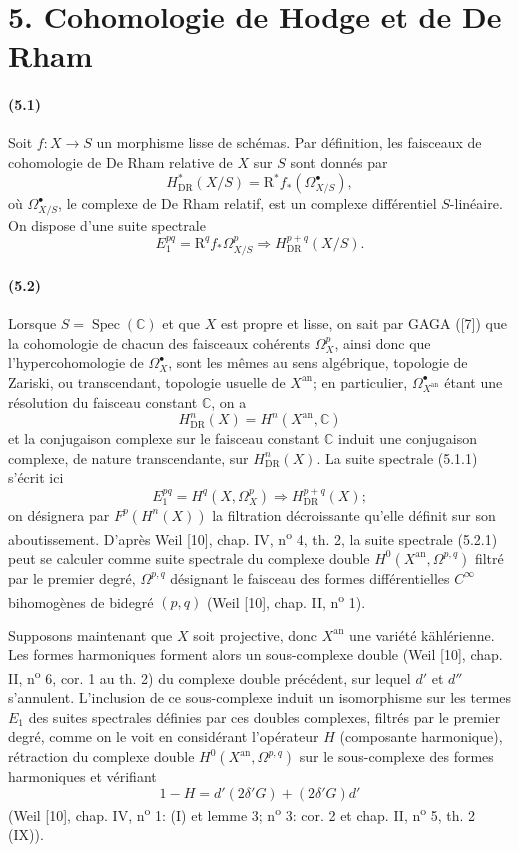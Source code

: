 \documentclass[10pt]{article}
\newcommand{\R}{\mathrm R}
\providecommand{\C}{\mathbb C}
\providecommand{\Spec}{\operatorname{Spec}}
\providecommand{\DR}{\operatorname{DR}}
\providecommand{\an}{\mathrm{an}}
\begin{document}
\section*{5. Cohomologie de Hodge et de De Rham}

\paragraph{(5.1)} Soit $f:X\to S$ un morphisme lisse de schémas. Par définition, les faisceaux de cohomologie de De Rham relative de $X$ sur $S$ sont donnés par
\[
H_{\DR}^*(X/S)=\R^*f_*(\Omega_{X/S}^\bullet),
\]
où $\Omega_{X/S}^\bullet$, le complexe de De Rham relatif, est un complexe différentiel $S$-linéaire. On dispose d'une suite spectrale
\[
\tag{5.1.1}
E_1^{pq}=\R^qf_*\Omega_{X/S}^p\Longrightarrow H_{\DR}^{p+q}(X/S).
\]

\paragraph{(5.2)} Lorsque $S=\Spec(\C)$ et que $X$ est propre et lisse, on sait par GAGA ([7]) que la cohomologie de chacun des faisceaux cohérents $\Omega_X^p$, ainsi donc que l'hypercohomologie de $\Omega_X^\bullet$, sont les mêmes au sens algébrique, topologie de Zariski, ou transcendant, topologie usuelle de $X^{\an}$; en particulier, $\Omega_{X^{\an}}^\bullet$ étant une résolution du faisceau constant $\C$, on a
\[
H_{\DR}^n(X)=H^n(X^{\an},\C)
\]
et la conjugaison complexe sur le faisceau constant $\C$ induit une conjugaison complexe, de nature transcendante, sur $H_{\DR}^n(X)$. La suite spectrale (5.1.1) s'écrit ici
\[
\tag{5.2.1}
E_1^{pq}=H^q(X,\Omega_X^p)\Longrightarrow H_{\DR}^{p+q}(X);
\]
on désignera par $F^p(H^n(X))$ la filtration décroissante qu'elle définit sur son aboutissement. D'après Weil [10], chap. IV, n\textsuperscript{o} 4, th. 2, la suite spectrale (5.2.1) peut se calculer comme suite spectrale du complexe double $H^0(X^{\an},\Omega^{p,q})$ filtré par le premier degré, $\Omega^{p,q}$ désignant le faisceau des formes différentielles $C^\infty$ bihomogènes de bidegré $(p,q)$ (Weil [10], chap. II, n\textsuperscript{o} 1).

Supposons maintenant que $X$ soit projective, donc $X^{\an}$ une variété kählérienne. Les formes harmoniques forment alors un sous-complexe double (Weil [10], chap. II, n\textsuperscript{o} 6, cor. 1 au th. 2) du complexe double précédent, sur lequel $d'$ et $d''$ s'annulent. L'inclusion de ce sous-complexe induit un isomorphisme sur les termes $E_1$ des suites spectrales définies par ces doubles complexes, filtrés par le premier degré, comme on le voit en considérant l'opérateur $H$ (composante harmonique), rétraction du complexe double $H^0(X^{\an},\Omega^{p,q})$ sur le sous-complexe des formes harmoniques et vérifiant
\[
1-H=d'(2\delta'G)+(2\delta'G)d'
\]
(Weil [10], chap. IV, n\textsuperscript{o} 1: (I) et lemme 3; n\textsuperscript{o} 3: cor. 2 et chap. II, n\textsuperscript{o} 5, th. 2 (IX)).
\end{document}
